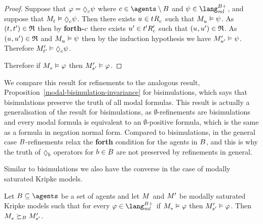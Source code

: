 \begin{proof}
Suppose that $\phi = \possibleC \psi$ where $\agentC \in \agents \setminus \agentsB$ and $\psi \in \langMlPlusBs$, and suppose that $\kPModel{\kStateT} \entails \possibleC \psi$.
Then there exists $\kStateU \in \kSuccessorsC{\kStateT}$ such that $\kPModel{\kStateU} \entails \psi$.
As $(\kStateT, \kStateTP) \in \refinement$ then by {\bf forth-$c$} there exists ${u}^{\prime} \in {{t}^{\prime}} {R^{\prime}_{c}}$ such that $(\kStateU, \kStateUP) \in \refinement$.
As $(\kStateU, \kStateUP) \in \refinement$ and $\kPModel{\kStateU} \entails \psi$ then by the induction hypothesis we have ${M^{\prime}_{{u}^{\prime}}} \vDash \psi$.
Therefore $\kPModelP{\kStateTP} \entails \possibleC \psi$.

Therefore if $\kPModel{\kStateS} \entails \phi$ then ${M^{\prime}_{{s}^{\prime}}} \vDash \varphi$.
\end{proof}

We compare this result for refinements to the analogous result, Proposition~\ref{modal-bisimulation-invariance} for bisimulations, which says that bisimulations preserve the truth of all modal formulas.
This result is actually a generalisation of the result for bisimulations, as $\emptyset$-refinements are bisimulations and every modal formula is equivalent to an $\emptyset$-positive formula, which is the same as a formula in negation normal form.
Compared to bisimulations, in the general case $B$-refinements relax the {\bf forth} condition for the agents in $B$, and this is why the truth of $\possibleB$ operators for $b \in B$ are not preserved by refinements in general.

Similar to bisimulations we also have the converse in the case of modally saturated Kripke models.

\begin{proposition}\label{refinements-hennessy-milner}
Let $\agentsB \subseteq \agents$ be a set of agents and let $\kModel$ and ${M^{\prime}_{}}$ be modally saturated Kripke models such that for every $\phi \in \langMlPlusBs$ if $\kPModel{\kStateS} \entails \phi$ then ${M^{\prime}_{{s}^{\prime}}} \vDash \varphi$.
Then $\kPModel{\kStateS} \simulatesBs \kPModelP{\kStateSP}$.
\end{proposition}

